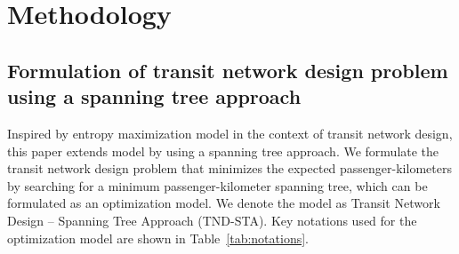 \documentclass[10pt,english]{article}
\newcommand{\tabref}[1]{Table~\ref{#1}}
\begin{document}
\section{Methodology}
\label{sec:methodology}

\subsection{Formulation of transit network design problem using a spanning tree approach}\label{sec:tnd_sta_bilebel_formulation}

Inspired by \citet{Bell2020} entropy maximization model in the context of transit network design, this paper extends \citet{Bell2020} model by using a spanning tree approach.
We formulate the transit network design problem that minimizes the expected passenger-kilometers by searching for a minimum passenger-kilometer spanning tree, which can be formulated as an optimization model. 
We denote the model as Transit Network Design -- Spanning Tree Approach (TND-STA).
Key notations used for the optimization model are shown in \tabref{tab:notations}.
\end{document}
